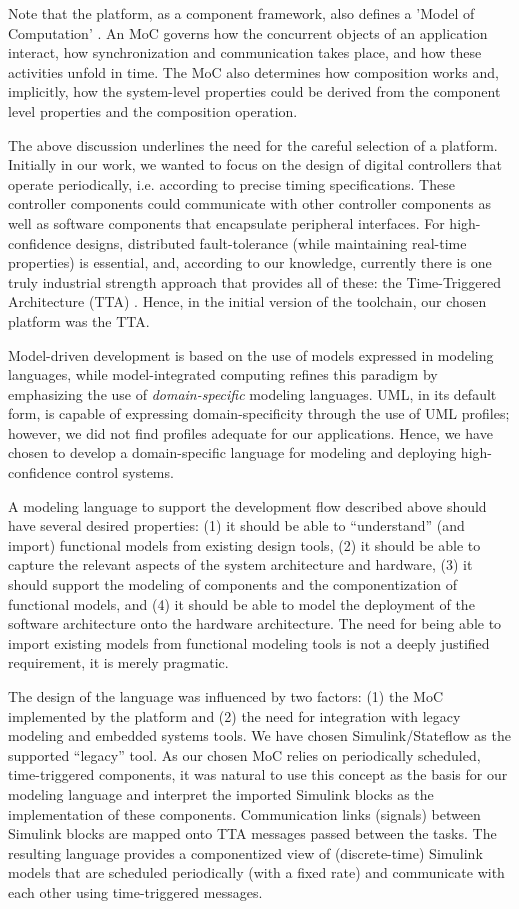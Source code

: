 Note that the platform, as a component framework, also defines a 'Model of Computation' \cite{Lee:M97/11}. An MoC governs how the concurrent objects of an application interact, how synchronization and communication takes place, and how these activities unfold in time. The MoC also determines how composition works and, implicitly, how the system-level properties could be derived from the component level properties and the composition operation.

The above discussion underlines the need for the careful selection of a platform. Initially in our work, we wanted to focus on the design of digital controllers that operate periodically, i.e. according to precise timing specifications. These controller components could communicate with other controller components as well as software components that encapsulate peripheral interfaces. For high-confidence designs, distributed fault-tolerance (while maintaining real-time properties) is essential, and, according to our knowledge, currently there is one truly industrial strength approach that provides all of these: the Time-Triggered Architecture (TTA) \cite{kopetz:2001-22}. Hence, in the initial version of the toolchain, our chosen platform was the TTA.

Model-driven development is based on the use of models expressed in modeling languages, while model-integrated computing refines this paradigm by emphasizing the use of \emph{domain-specific} modeling languages. UML, in its default form, is capable of expressing domain-specificity through the use of UML profiles; however, we did not find profiles adequate for our applications. Hence, we have chosen to develop a domain-specific language for modeling and deploying high-confidence control systems.

A modeling language to support the development flow described above should have several desired properties: (1) it should be able to ``understand'' (and import) functional models from existing design tools, (2) it should be able to capture the relevant aspects of the system architecture and hardware, (3) it should support the modeling of components and the componentization of functional models, and (4) it should be able to model the deployment of the software architecture onto the hardware architecture. The need for being able to import existing models from functional modeling tools is not a deeply justified requirement, it is merely pragmatic.

The design of the language was influenced by two factors: (1) the MoC implemented by the platform and (2) the need for integration with legacy modeling and embedded systems tools. We have chosen Simulink/Stateflow as the supported ``legacy'' tool. As our chosen MoC relies on periodically scheduled, time-triggered components, it was natural to use this concept as the basis for our modeling language and interpret the imported Simulink blocks as the implementation of these components. Communication links (signals) between Simulink blocks are mapped onto TTA messages passed between the tasks. The resulting language provides a componentized view of (discrete-time) Simulink models that are scheduled periodically (with a fixed rate) and communicate with each other using time-triggered messages.

